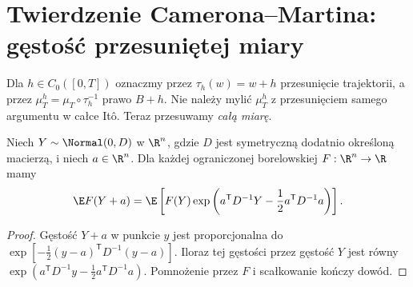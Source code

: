 \section{Twierdzenie Camerona--Martina: gęstość przesuniętej miary}

Dla $h\in C_0([0,T])$ oznaczmy przez $\tau_h(w)=w+h$
przesunięcie trajektorii, a przez
$\mu_T^h=\mu_T\circ\tau_h^{-1}$ prawo $B+h$.
Nie należy mylić $\mu_T^h$ z przesunięciem samego argumentu
w całce Itô. Teraz przesuwamy \emph{całą miarę}.

\begin{lemat}
\label{lem:gauss-shift}
Niech $Y\sim\Normal(0,D)$ w $\R^n$, gdzie $D$ jest
symetryczną dodatnio określoną macierzą, i niech
$a\in\R^n$. Dla każdej ograniczonej borelowskiej
$F:\R^n\to\R$ mamy
\[
\E F(Y+a)=\E\left[F(Y)\exp\left(
 a^{\mathsf T}D^{-1}Y-\frac12a^{\mathsf T}D^{-1}a
\right)\right].
\]
\end{lemat}
\begin{proof}
Gęstość $Y+a$ w punkcie $y$ jest proporcjonalna do
$\exp[-\frac12(y-a)^{\mathsf T}D^{-1}(y-a)]$.
Iloraz tej gęstości przez gęstość $Y$ jest równy
$\exp(a^{\mathsf T}D^{-1}y-\frac12a^{\mathsf T}D^{-1}a)$.
Pomnożenie przez $F$ i scałkowanie kończy dowód.
\end{proof}

